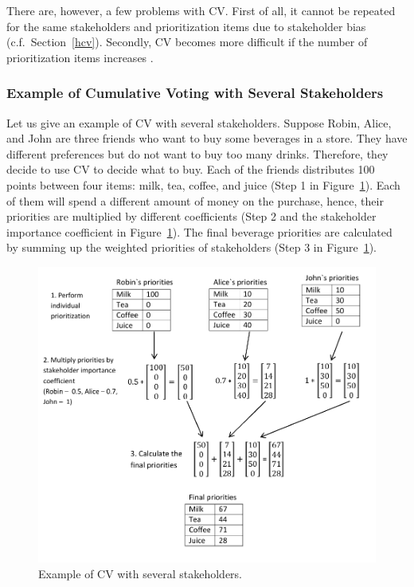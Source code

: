 There are, however, a few problems with CV. First of all, it cannot be repeated for the
same stakeholders and prioritization items due to stakeholder bias
\citep{Leffingwell1999} (c.f.\ Section~\ref{hcv}). Secondly, CV becomes more difficult if the number of prioritization items increases \citep{Berander2009a}.

\subsubsection{Example of Cumulative Voting with Several Stakeholders}

Let us give an example of CV with several stakeholders. Suppose Robin,
Alice, and John are three friends who want to buy some beverages in
a store. They have different preferences but do not want to buy too
many drinks. Therefore, they decide to use CV to decide what to buy.
Each of the friends distributes 100 points between four items: milk,
tea, coffee, and juice (Step 1 in Figure~\ref{fig:Example-of-Cumulative}).
Each of them will spend a different amount of money on the purchase,
hence, their priorities are multiplied by different coefficients
(Step 2 and the stakeholder importance coefficient in Figure~\ref{fig:Example-of-Cumulative}).
The final beverage priorities are calculated by summing up the weighted priorities
of stakeholders (Step 3 in Figure~\ref{fig:Example-of-Cumulative}).


\begin{figure}
	\center
\includegraphics[scale=0.55]{fig/cv}
\caption{\label{fig:Example-of-Cumulative}Example of CV with several stakeholders.}
\end{figure}

